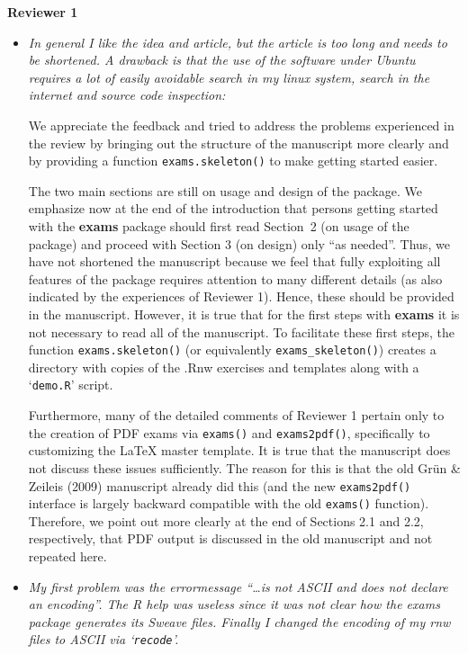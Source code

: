\documentclass[a4paper]{article}
\begin{document}
\textbf{\Large Reviewer 1}

\medskip

\begin{itemize}

\item {\it
In general I like the idea and article, but the article is too long and
needs to be shortened. A drawback is that the use of the software under
Ubuntu requires a lot of easily avoidable search in my linux system, search
in the internet and source code inspection:}

We appreciate the feedback and tried to address the problems experienced
in the review by bringing out the structure of the manuscript more clearly
and by providing a function \texttt{exams.skeleton()} to make getting started
easier.

The two main sections are still on usage and design of the package. We
emphasize now at the end of the introduction that persons getting started
with the \textbf{exams} package should first read Section~2 (on usage of the package)
and proceed with Section 3 (on design) only ``as needed''. Thus, we have not
shortened the manuscript because we feel that fully exploiting all features
of the package requires attention to many different details (as also indicated
by the experiences of Reviewer 1). Hence, these should be provided in the
manuscript. However, it is true that for the first steps with \textbf{exams} it
is not necessary to read all of the manuscript. To facilitate these first
steps, the function \texttt{exams.skeleton()} (or equivalently \verb|exams_skeleton()|)
creates a directory with copies of the .Rnw exercises and templates along
with a `\texttt{demo.R}' script.

Furthermore, many of the detailed comments of Reviewer 1 pertain only to
the creation of PDF exams via \texttt{exams()} and \texttt{exams2pdf()}, specifically to
customizing the {\LaTeX} master template. It is true that the manuscript does
not discuss these issues sufficiently. The reason for this is that the old
Gr\"un \& Zeileis (2009) manuscript already did this (and the new \texttt{exams2pdf()}
interface is largely backward compatible with the old \texttt{exams()} function).
Therefore, we point out more clearly at the end of Sections 2.1 and 2.2,
respectively, that PDF output is discussed in the old manuscript and not
repeated here.

\item {\it
My first problem was the errormessage ``\dots is not ASCII and does not
declare an encoding''.  The R help was useless since it was not clear how
the exams package generates its Sweave files.  Finally I changed the
encoding of my rnw files to ASCII via `\texttt{recode}'.}


\end{itemize}
\end{document}
